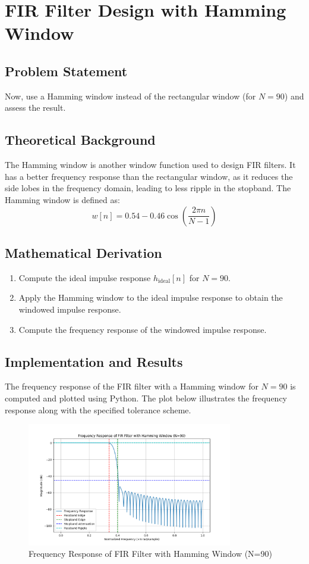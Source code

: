 \item[(g)]
\section{FIR Filter Design with Hamming Window}

\subsection*{Problem Statement}
Now, use a Hamming window instead of the rectangular window (for \( N = 90 \)) and assess the result.

\subsection*{Theoretical Background}
The Hamming window is another window function used to design FIR filters. It has a better frequency response than the rectangular window, as it reduces the side lobes in the frequency domain, leading to less ripple in the stopband. The Hamming window is defined as:
\[ w[n] = 0.54 - 0.46 \cos \left( \frac{2\pi n}{N-1} \right) \]

\subsection*{Mathematical Derivation}
\begin{enumerate}
    \item Compute the ideal impulse response \( h_{\text{ideal}}[n] \) for \( N = 90 \).
    \item Apply the Hamming window to the ideal impulse response to obtain the windowed impulse response.
    \item Compute the frequency response of the windowed impulse response.
\end{enumerate}

\subsection*{Implementation and Results}
The frequency response of the FIR filter with a Hamming window for \( N = 90 \) is computed and plotted using Python. The plot below illustrates the frequency response along with the specified tolerance scheme.

\begin{figure}[h]
    \centering
    \includegraphics[width=0.8\textwidth]{fig/ex4_g_frequency_response_hamming.png}
    \caption{Frequency Response of FIR Filter with Hamming Window (N=90)}
    \label{fig:ex4_g_frequency_response_hamming}
\end{figure}

